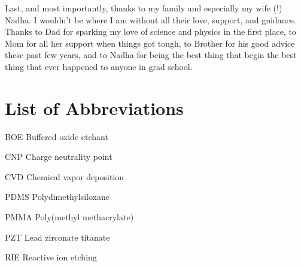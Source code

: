 \documentclass[edeposit,fullpage,draftthesis]{uiucthesis2009}
\begin{document}
Last, and most importantly, thanks to my family and especially my wife (!) Nadha.
I wouldn't be where I am without all their love, support, and guidance. Thanks to Dad
for sparking my love of science and physics in the first place, to Mom for all her support
when things got tough, to Brother for his good advice these past few years, and 
to Nadha for being the best thing that begin the best thing that ever happened to anyone in grad school.





\setcounter{tocdepth}{2}

\tableofcontents
\listoffigures

\chapter{List of Abbreviations}

\begin{symbollist*}
\item[BOE] Buffered oxide etchant
\item[CNP] Charge neutrality point
\item[CVD] Chemical vapor deposition
\item[PDMS] Polydimethylsiloxane
\item[PMMA] Poly(methyl methacrylate)
\item[PZT] Lead zirconate titanate
\item[RIE] Reactive ion etching
\end{symbollist*}

\end{document}
